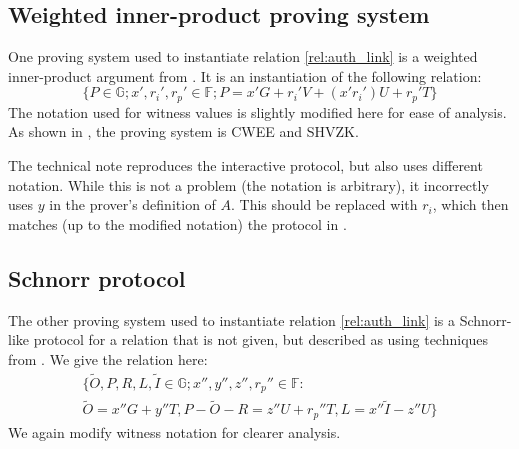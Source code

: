 \documentclass{article}
\theoremstyle{definition}
\newcommand{\GG}{\mathbb{G}}
\newcommand{\FF}{\mathbb{F}}
\newcommand{\wt}[1]{\widetilde{#1}}
\begin{document}
\subsection{Weighted inner-product proving system}

One proving system used to instantiate relation \ref{rel:auth_link} is a weighted inner-product argument from \cite{bpp}.
It is an instantiation of the following relation:
\begin{equation}
	\label{rel:wip}
	\Big\{ P \in \GG ; x', r_i', r_p' \in \FF ; P = x' G + r_i' V + (x' r_i') U + r_p' T \Big\}
\end{equation}
The notation used for witness values is slightly modified here for ease of analysis.
As shown in \cite{bpp}, the proving system is CWEE and SHVZK.

The technical note reproduces the interactive protocol, but also uses different notation.
While this is not a problem (the notation is arbitrary), it incorrectly uses $y$ in the prover's definition of $A$.
This should be replaced with $r_i$, which then matches (up to the modified notation) the protocol in \cite{bpp}.


\subsection{Schnorr protocol}

The other proving system used to instantiate relation \ref{rel:auth_link} is a Schnorr-like protocol for a relation that is not given, but described as using techniques from \cite{schnorr}.
We give the relation here:
\begin{multline}
	\label{rel:schnorr}
	\Big\{ \wt{O}, P, R, L, \wt{I} \in \GG ; x'', y'', z'', r_p'' \in \FF : \\
	\wt{O} = x'' G + y'' T, P - \wt{O} - R = z'' U + r_p'' T, L = x'' \wt{I} - z'' U \Big\}
\end{multline}
We again modify witness notation for clearer analysis.
\end{document}
